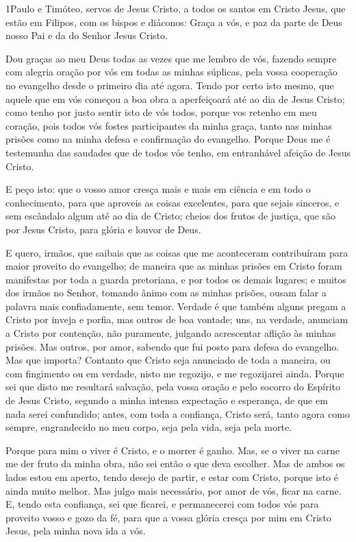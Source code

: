 
\lettrine{1} Paulo e Timóteo, servos de Jesus Cristo, a todos
os santos em Cristo Jesus, que estão em Filipos, com os bispos e
diáconos: Graça a vós, e paz da parte de Deus nosso Pai e da do
Senhor Jesus Cristo.

Dou graças ao meu Deus todas as vezes que me lembro de vós,
fazendo sempre com alegria oração por vós em todas as minhas
súplicas, pela vossa cooperação no evangelho desde o primeiro
dia até agora. Tendo por certo isto mesmo, que aquele que em vós
começou a boa obra a aperfeiçoará até ao dia de Jesus Cristo;
como tenho por justo sentir isto de vós todos, porque vos
retenho em meu coração, pois todos vós fostes participantes da minha
graça, tanto nas minhas prisões como na minha defesa e confirmação
do evangelho. Porque Deus me é testemunha das saudades que de
todos vós tenho, em entranhável afeição de Jesus Cristo.

E peço isto: que o vosso amor cresça mais e mais em ciência e em
todo o conhecimento, para que aproveis as coisas excelentes,
para que sejais sinceros, e sem escândalo algum até ao dia de
Cristo; cheios dos frutos de justiça, que são por Jesus
Cristo, para glória e louvor de Deus.

E quero, irmãos, que saibais que as coisas que me aconteceram
contribuíram para maior proveito do evangelho; de maneira que
as minhas prisões em Cristo foram manifestas por toda a guarda
pretoriana, e por todos os demais lugares; e muitos dos
irmãos no Senhor, tomando ânimo com as minhas prisões, ousam falar a
palavra mais confiadamente, sem temor. Verdade é que também
alguns pregam a Cristo por inveja e porfia, mas outros de boa
vontade; uns, na verdade, anunciam a Cristo por contenção,
não puramente, julgando acrescentar aflição às minhas prisões.
Mas outros, por amor, sabendo que fui posto para defesa do
evangelho. Mas que importa? Contanto que Cristo seja
anunciado de toda a maneira, ou com fingimento ou em verdade, nisto
me regozijo, e me regozijarei ainda. Porque sei que disto me
resultará salvação, pela vossa oração e pelo socorro do Espírito de
Jesus Cristo, segundo a minha intensa expectação e esperança,
de que em nada serei confundido; antes, com toda a confiança, Cristo
será, tanto agora como sempre, engrandecido no meu corpo, seja pela
vida, seja pela morte.

Porque para mim o viver é Cristo, e o morrer é ganho. Mas,
se o viver na carne me der fruto da minha obra, não sei então o que
deva escolher. Mas de ambos os lados estou em aperto, tendo
desejo de partir, e estar com Cristo, porque isto é ainda muito
melhor. Mas julgo mais necessário, por amor de vós, ficar na
carne. E, tendo esta confiança, sei que ficarei, e
permanecerei com todos vós para proveito vosso e gozo da fé,
para que a vossa glória cresça por mim em Cristo Jesus, pela
minha nova ida a vós.


